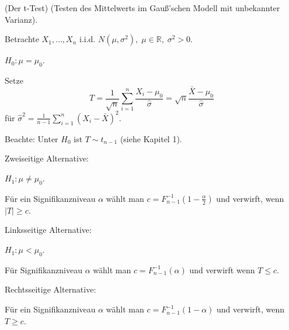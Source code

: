 \documentclass{tstextbook}
\newcommand{\R}{\mathbb R}
\begin{document}
\begin{example}(Der t-Test)
	(Testen des Mittelwerts im Gauß'schen Modell mit unbekannter Varianz).
	
		Betrachte $ X_1,\ldots,X_n $ i.i.d. $ N(\mu,\sigma^2), \; \mu\in\R, \;\sigma^2>0 $. 
	
	$ H_0\colon \mu=\mu_0 $. 
	
	Setze \[ T = \frac{1}{\sqrt{n}}\sum_{i=1}^{n}\frac{X_i-\mu_0}{\hat{\sigma}} = \sqrt{n}\frac{\bar{X}-\mu_0}{\hat{\sigma}} \] für $ \hat{\sigma}^2 = \frac{1}{n-1}\sum_{i=1}^{n}(X_i-\bar{X})^2 $.
	
	Beachte: Unter $ H_0 $ ist $ T\sim t_{n-1} $ (siehe Kapitel 1).
	
	Zweiseitige Alternative:
	
	$ H_1\colon \mu\ne\mu_0 $.
	
	Für ein Signifikanzniveau $ \alpha $ wählt man $ c=F_{n-1}^{-1}\left(1-\frac{\alpha}{2}\right) $ und verwirft, wenn $ |T|\ge c $. 
	
	Linksseitige Alternative: 
	
	$ H_1\colon \mu < \mu_0 $. 
	
	Für Signifikanzniveau $ \alpha $ wählt man $ c=F_{n-1}^{-1}(\alpha) $ und verwirft wenn $ T\le c $. 
	
	Rechtsseitige Alternative:
	
	Für ein Signifikanzniveau $ \alpha $ wählt man $ c=F_{n-1}^{-1}\left(1-\alpha\right) $ und verwirft, wenn $ T\ge c $.
	
	
\end{example}
\end{document}
